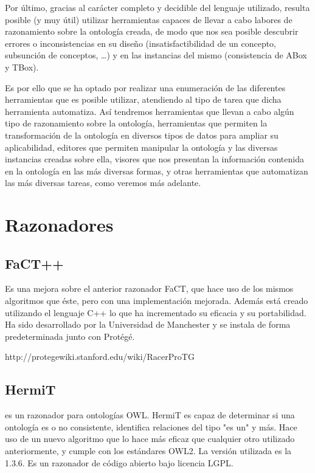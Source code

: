 Por último, gracias al carácter completo y decidible del lenguaje utilizado, resulta posible (y muy útil) utilizar herramientas capaces de llevar a cabo labores de razonamiento sobre la ontología creada, de modo que nos sea posible descubrir errores o inconsistencias en su diseño (insatisfactibilidad de un concepto, subsunción de conceptos, \ldots) y en las instancias del mismo (consistencia de ABox y TBox). 

Es por ello que se ha optado por realizar una enumeración de las diferentes herramientas que es posible utilizar, atendiendo al tipo de tarea que dicha herramienta automatiza. Así tendremos herramientas que llevan a cabo algún tipo de razonamiento sobre la ontología, herramientas que permiten la transformación de la ontología en diversos tipos de datos para ampliar su aplicabilidad, editores que permiten manipular la ontología y las diversas instancias creadas sobre ella, visores que nos presentan la información contenida en la ontología en las más diversas formas, y otras herramientas que automatizan las más diversas tareas, como veremos más adelante.

\section{Razonadores}

\subsection{FaCT++} Es una mejora sobre el anterior razonador FaCT, que hace uso de los mismos algoritmos que éste, pero con una implementación mejorada. Además está creado utilizando el lenguaje C++ lo que ha incrementado su eficacia y su portabilidad. Ha sido desarrollado por la Universidad de Manchester y se instala de forma predeterminada junto con Protégé.

http://protegewiki.stanford.edu/wiki/RacerProTG

\subsection{HermiT} es un razonador para ontologías OWL. HermiT es capaz de determinar si una ontología es o no consistente, identifica relaciones del tipo "es un" y más. Hace uso de un nuevo algoritmo que lo hace más eficaz que cualquier otro utilizado anteriormente, y cumple con los estándares OWL2. La versión utilizada es la 1.3.6. Es un razonador de código abierto bajo licencia LGPL.

